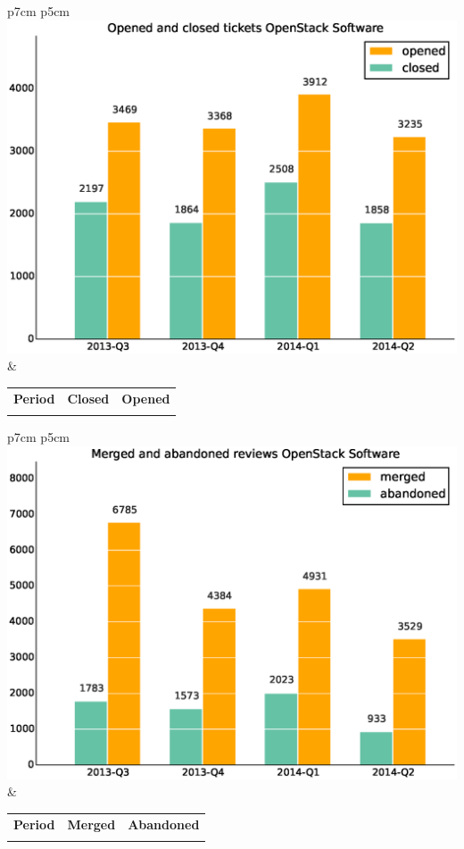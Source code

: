 \documentclass[a4wide,11pt]{report}
\begin{document}
\begin{tabular}{p{7cm} p{5cm}}
    \vspace{0pt} 
    \includegraphics[scale=.35]{figs/closedOpenStackSoftware.eps}
    & 
    \vspace{0pt}
    \begin{tabular}{l|r|r|}%
    \bfseries Period & \bfseries Closed & \bfseries Opened%
    \csvreader[head to column names]{data/closedOpenStackSoftware.csv}{}%
    {\\ & \closed & \opened}
    \end{tabular}
\end{tabular}

\begin{tabular}{p{7cm} p{5cm}}
    \vspace{0pt} 
    \includegraphics[scale=.35]{figs/submitted_reviewsOpenStackSoftware.eps}
    & 
    \vspace{0pt}
    \begin{tabular}{l|r|r|}%
    \bfseries Period & \bfseries Merged & \bfseries Abandoned %
    \csvreader[head to column names]{data/submitted_reviewsOpenStackSoftware.csv}{}%
    {\\ & \merged & \abandoned}
    \end{tabular}
\end{tabular}
\end{document}

